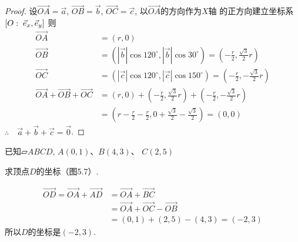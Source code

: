 \begin{proof}
    设$\Vec{OA}=\vec{a}$, $\Vec{OB}=\vec{b}$, 
$\Vec{OC}=\vec{c}$, 以$\Vec{OA}$的方向作为$X$轴
的正方向建立坐标系$[O:\; \vec{e}_x,\vec{e}_y]$
则 
\[\begin{split}
    \Vec{OA}&=(r, 0)\\
    \Vec{OB}&=\left(|\vec{b}|\cos120^{\circ}, |\vec{b}|\cos 30^{\circ}\right)=\left(-\frac{r}{2},\frac{\sqrt{3}}{2}r\right)\\
    \Vec{OC}&=\left(|\vec{c}|\cos120^{\circ}, |\vec{c}|\cos 150^{\circ}\right)=\left(-\frac{r}{2},-\frac{\sqrt{3}}{2}r\right)\\
    \Vec{OA}+  \Vec{OB}+\Vec{OC}&=(r,0)+\left(-\frac{r}{2},\frac{\sqrt{3}}{2}r\right)+\left(-\frac{r}{2},-\frac{\sqrt{3}}{2}r\right)\\
    &=\left(r-\frac{r}{2}-\frac{r}{2}, 0+\frac{\sqrt{3}}{2}-\frac{\sqrt{3}}{2}\right)=(0,0)
\end{split}\]
$\therefore\quad \vec{a}+\vec{b}+\vec{c}=\vec{0}$.
\end{proof}

\begin{example}
    已知$\parallelogram{ABCD}$, $A(0,1)$、$B(4,3)$、
$C(2,5)$

求顶点$D$的坐标（图5.7）.
\end{example}

\begin{solution}
\[\begin{split}
\Vec{OD}=\Vec{OA}+\Vec{AD}&=\Vec{OA}+\Vec{BC}\\
&=\Vec{OA}+\Vec{OC}-\Vec{OB}\\
&=(0,1)+(2,5)-(4,3)=(-2,3)
\end{split}\]
所以$D$的坐标是$(-2,3)$.
\end{solution}

